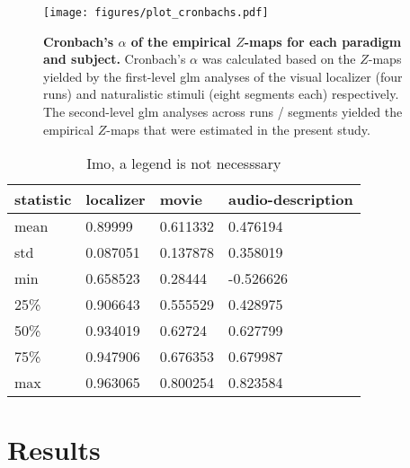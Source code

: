 \begin{figure*}[tbp] \centering
    \texttt{[image: figures/plot\_cronbachs.pdf]}
    \caption{\textbf{Cronbach's $\alpha$ of the empirical $Z$-maps for each
    paradigm and subject.}
    Cronbach's $\alpha$ was calculated based on the $Z$-maps yielded by the
    first-level \ac{glm} analyses of the visual localizer
    \citep{sengupta2016extension} (four runs) and naturalistic stimuli
    \citep{haeusler2022processing} (eight segments each) respectively.
    The second-level \ac{glm} analyses across runs / segments yielded the
    empirical $Z$-maps that were estimated in the present study.
    }
    \label{fig:cronbachs}
\end{figure*}


\begin{table*}[btp]
\centering
    \caption{
    \textbf{Descriptive statistics of Cronbach's $\alpha$ across subjects.}
    Cronbach's $\alpha$ of the empirical $Z$-maps that are the result of the
    second-level \ac{glm} analyses performed in
    \citet{sengupta2016extension} and \citet{haeusler2022processing}. Values of
    Cronbach's $\alpha$ were calculated based on the first-level $Z$-maps (four
    in case of the visual localizer; eight in case of the naturalistic stimuli)}
\label{tab:cronbachs}
\begin{tabular}{llll}
    \toprule
    \textbf{statistic} & \textbf{localizer} & \textbf{movie} & \textbf{audio-description} \\
    \midrule
    mean & 0.89999 & 0.611332 & 0.476194 \tabularnewline
    std & 0.087051 & 0.137878 & 0.358019 \tabularnewline
    min & 0.658523 & 0.28444 & -0.526626 \tabularnewline
    25\% & 0.906643 & 0.555529 & 0.428975 \tabularnewline
    50\% & 0.934019 & 0.62724 & 0.627799 \tabularnewline
    75\% & 0.947906 & 0.676353 & 0.679987 \tabularnewline
    max & 0.963065 & 0.800254 & 0.823584 \tabularnewline
    \bottomrule
\end{tabular}
\caption*{Imo, a legend is not necesssary}
\end{table*}



\section{Results}


\begin{comment}

``Because the localizer task comprises several scanning runs, we calculated the
reliability of the localizer across runs with Cronbach's alpha to provide an
estimate of the noise ceiling for these correlations'' \citep{jiahui2022cross}.

\end{comment}


